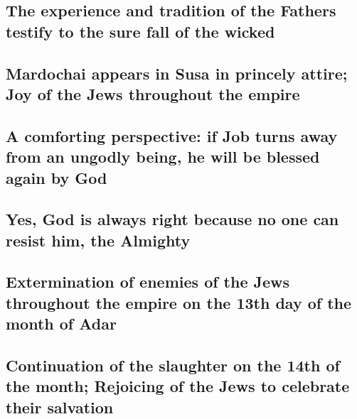 \hypertarget{the-experience-and-tradition-of-the-fathers-testify-to-the-sure-fall-of-the-wicked}{%
\subsection{The experience and tradition of the Fathers testify to the
sure fall of the
wicked}\label{the-experience-and-tradition-of-the-fathers-testify-to-the-sure-fall-of-the-wicked}}

\hypertarget{mardochai-appears-in-susa-in-princely-attire-joy-of-the-jews-throughout-the-empire}{%
\subsection{Mardochai appears in Susa in princely attire; Joy of the
Jews throughout the
empire}\label{mardochai-appears-in-susa-in-princely-attire-joy-of-the-jews-throughout-the-empire}}

\hypertarget{a-comforting-perspective-if-job-turns-away-from-an-ungodly-being-he-will-be-blessed-again-by-god}{%
\subsection{A comforting perspective: if Job turns away from an ungodly
being, he will be blessed again by
God}\label{a-comforting-perspective-if-job-turns-away-from-an-ungodly-being-he-will-be-blessed-again-by-god}}

\hypertarget{yes-god-is-always-right-because-no-one-can-resist-him-the-almighty}{%
\subsection{Yes, God is always right because no one can resist him, the
Almighty}\label{yes-god-is-always-right-because-no-one-can-resist-him-the-almighty}}

\hypertarget{extermination-of-enemies-of-the-jews-throughout-the-empire-on-the-13th-day-of-the-month-of-adar}{%
\subsection{Extermination of enemies of the Jews throughout the empire
on the 13th day of the month of
Adar}\label{extermination-of-enemies-of-the-jews-throughout-the-empire-on-the-13th-day-of-the-month-of-adar}}

\hypertarget{continuation-of-the-slaughter-on-the-14th-of-the-month-rejoicing-of-the-jews-to-celebrate-their-salvation}{%
\subsection{Continuation of the slaughter on the 14th of the month;
Rejoicing of the Jews to celebrate their
salvation}\label{continuation-of-the-slaughter-on-the-14th-of-the-month-rejoicing-of-the-jews-to-celebrate-their-salvation}}

